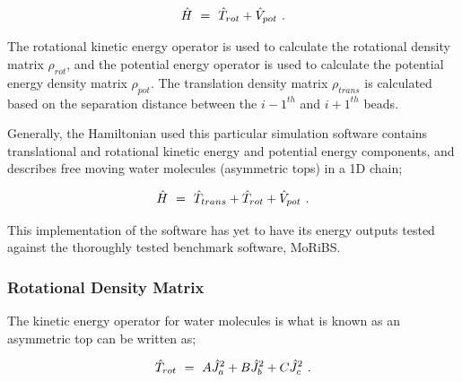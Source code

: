 \documentclass{ece}
\begin{document}
\begin{equation} \label{eq:61}
\hat{H} \hspace{0.125cm} = \hspace{0.125cm} \hat{T}_{rot} + \hat{V}_{pot} \hspace{0.125cm} .
\end{equation}

The rotational kinetic energy operator is used to calculate the rotational density matrix \begin{math} \rho_{rot} \end{math}, and the potential energy operator is used to calculate the potential energy density matrix \begin{math} \rho_{pot} \end{math}. The translation density matrix \begin{math} \rho_{trans} \end{math} is calculated based on the separation distance between the \begin{math} i-1^{th} \end{math} and \begin{math} i+1^{th} \end{math} beads. 

Generally, the Hamiltonian used this particular simulation software contains translational and rotational kinetic energy and potential energy components, and describes free moving water molecules (asymmetric tops) in a 1D chain;

\begin{equation} \label{eq:61}
\hat{H} \hspace{0.125cm} = \hspace{0.125cm} \hat{T}_{trans} + \hat{T}_{rot} + \hat{V}_{pot} \hspace{0.125cm} .
\end{equation}

This implementation of the software has yet to have its energy outputs tested against the thoroughly tested benchmark software, \gls{MoRiBS}. 

\subsubsection{Rotational Density Matrix}

The kinetic energy operator for water molecules is what is known as an asymmetric top can be written as;

\begin{equation} \label{eq:66}
\hat{T}_{rot} \hspace{0.125cm} = \hspace{0.125cm} A \hat{J}^{2}_{a} + B \hat{J}^{2}_{b} + C \hat{J}^{2}_{c} \hspace{0.125cm} .
\end{equation}
\end{document}
